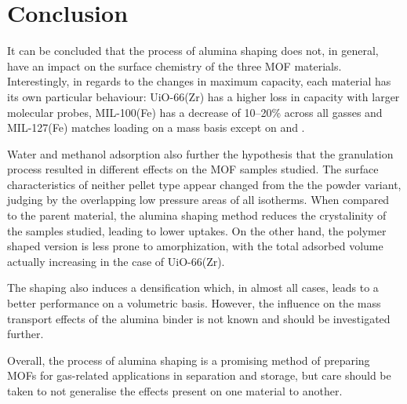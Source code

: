 
\FloatBarrier%

\section{Conclusion}

It can be concluded that the process of alumina shaping does not, in 
general, have an impact on the surface chemistry of the three MOF
materials. Interestingly, in regards to the changes in maximum capacity,
each material has its own particular behaviour: UiO-66(Zr) has a 
higher loss in capacity with larger molecular probes, MIL-100(Fe) 
has a decrease of 10--20\% across all gasses and MIL-127(Fe) matches
loading on a mass basis except on  and .

Water and methanol adsorption also further the hypothesis that 
the granulation process resulted in different
effects on the MOF samples studied. The surface 
characteristics of neither pellet type appear changed from the 
the powder variant, judging by the overlapping low pressure
areas of all isotherms. When compared to the parent material,
the alumina shaping method reduces 
the crystalinity of the samples studied, leading to lower uptakes.
On the other hand, the polymer shaped version is less prone to
amorphization, with the total adsorbed volume actually increasing
in the case of UiO-66(Zr).

The shaping also induces a densification which, in almost all cases,
leads to a better performance on a volumetric basis. However, the 
influence on the mass transport effects of the alumina binder is 
not known and should be investigated further. 

Overall, the process of alumina shaping is a promising method of 
preparing MOFs for gas-related applications in separation and 
storage, but care should be taken to not generalise the effects
present on one material to another.

\pagebreak
